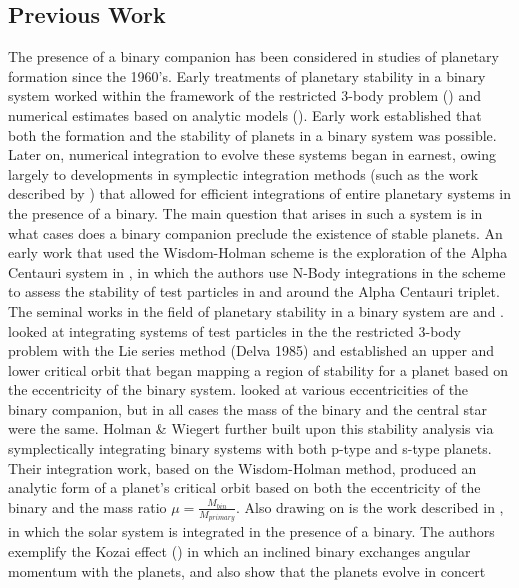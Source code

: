 \documentclass{aastex631}
\begin{document}
\subsection{Previous Work}
\indent The presence of a binary companion has been considered in studies of planetary formation since the 1960's. Early treatments of planetary stability in a binary system worked
within the framework of the restricted 3-body problem (\cite{hua60}) and numerical estimates based on analytic models (\cite{hep78}). Early work established that 
both the formation and the stability of planets in a binary system was possible.\\
Later on, numerical integration to evolve these systems began in earnest, owing largely to developments in symplectic integration methods (such as the work described 
by \cite{wis91}) that 
allowed for efficient integrations of entire planetary systems in the presence of a binary. The main question that arises in such a system is in what cases does a binary 
companion preclude the existence of stable planets. An early work that used the Wisdom-Holman scheme is the exploration of the Alpha Centauri system in \cite{wie97},
in which the authors use N-Body integrations in the \cite{wis91} scheme to assess the stability of test particles in and around the Alpha Centauri triplet. \\
\indent The seminal works in the field of planetary stability in a binary system are \cite{dvo86} and \cite{hol99}. \cite{dvo86} looked at integrating systems of test
particles in the
the restricted 3-body problem with the Lie series method (Delva 1985) and established an upper and lower critical orbit that began mapping a region of stability 
for a planet based on the eccentricity of the binary system. \cite{dvo86} looked at various eccentricities of the binary companion, but in all cases the mass of the binary and 
the central star were the same. 
 Holman \& Wiegert further built upon this stability analysis via symplectically integrating binary systems 
with both p-type and s-type planets. Their integration work, based on the Wisdom-Holman method,
 produced an analytic form of a planet's critical orbit based on both the eccentricity of the binary and the mass
ratio $\mu = \frac{M_{bin}}{M_{primary}}$. Also drawing on \cite{wis91} is the work described in \cite{ina97}, in which the solar system is integrated in the presence of a 
binary. The authors exemplify the Kozai effect (\cite{koz62}) in which an inclined binary exchanges angular momentum with the planets, and also show that the planets evolve in concert 
\end{document}

